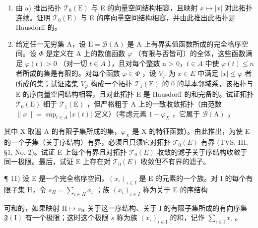 \begin{enumerate}
\def\labelenumi{\alph{enumi})}
\setcounter{enumi}{1}
\item
  由 a) 推出拓扑 \(\mathcal{T}_{0}(\mathrm{E})\) 与 E 的向量空间结构相容，且映射 \(x \mapsto |x|\) 对此拓扑连续。证明 \(\mathcal{T}_{0}(\mathrm{E})\) 与 E 的序向量空间结构相容，并由此推出此拓扑是 Hausdorff 的。
\item
  给定任一无穷集 A，设 \(\mathrm{E} = \mathcal{B}(\mathrm{A})\) 是 A 上有界实值函数所成的完全格序空间。设 \(\Phi\) 是定义在 A 上的数值函数 \(\varphi\) （有限与否皆可）的全体，这些函数满足 \(\varphi(t) > 0\) （对一切 \(t \in A\) ），且对每个整数 n \textgreater{} 0，\(t \in A\) 中使 \(\varphi(t) \leqslant n\) 者所成的集是有限的。对每个函数 \(\varphi \in \Phi\) ，设 \(V_{\varphi}\) 为 \(x \in E\) 中满足 \(|x| \leqslant \varphi\) 者所成的集；试证诸集 \(V_{\varphi}\) 构成一个拓扑 \(\mathcal{T}_{1}(\mathrm{E})\) 的 0 的基本邻域系，该拓扑与 E 的序向量空间结构相容，且对此拓扑 E 是 Hausdorff 的和完备的。试证拓扑 \(\mathcal{T}_{0}(\mathrm{E})\) 细于 \(\mathcal{T}_{1}(\mathrm{E})\) ，但严格粗于 A 上的一致收敛拓扑（由范数 \(\|x\| = \sup_{t \in A} |x(t)|\) 定义）（考虑元素 \(1 - \varphi_{X}\) ，它属于 \(\mathcal{B}(\mathrm{A})\) ，
\end{enumerate}

其中 X 取遍 A 的有限子集所成的集，\(\varphi_{X}\) 是 X 的特征函数）。由此推出，为使 E 的一个子集（关于序结构）有界，必须且只须它对拓扑 \(\mathcal{T}_{0}(E)\) 有界 (TVS, III, §1, No. 2)。试证 E 上每个有界且对拓扑 \(\mathcal{T}_{0}(E)\) 收敛的滤子关于序结构收敛于同一极限。最后，试证 E 上存在对 \(\mathcal{T}_{0}(E)\) 收敛但不有界的滤子。

¶ 11) 设 E 是一个完全格序空间，\((x_{\iota})_{\iota \in I}\) 是 E 的元素的一个族。对 I 的每个有限子集 H，令 \(s_{H} = \sum_{\iota \in H} x_{\iota}\) ；族 \((x_{\iota})_{\iota \in I}\) 称为关于 E 的序结构

可和的，如果映射 \(\mathrm{H} \mapsto s_{\mathrm{H}}\) 关于这一序结构、关于 I 的有限子集所成的有向序集 \(\mathfrak{F}(\mathrm{I})\) 有一个极限；这时这个极限 \(s\) 称为族 \((x_{\iota})_{\iota \in \mathrm{I}}\) 的和，记作 \(\sum_{\iota \in \mathrm{I}} x_{\iota}\) 。

